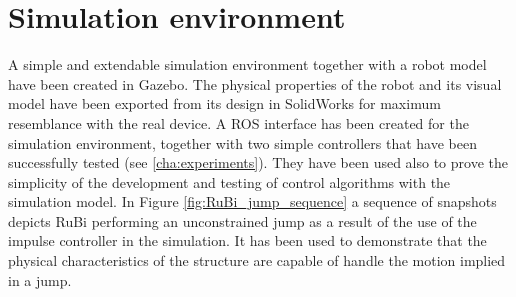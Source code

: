 \section{Simulation environment} %
\label{sec:simulation_environment}
A simple and extendable simulation environment together with a robot model have been created in Gazebo.
The physical properties of the robot and its visual model have been exported from its design in SolidWorks for maximum resemblance with the real device.
A ROS interface has been created for the simulation environment, together with two simple controllers that have been successfully tested (see \ref{cha:experiments}).
They have been used also to prove the simplicity of the development and testing of control algorithms with the simulation model.
In Figure \ref{fig:RuBi_jump_sequence} a sequence of snapshots depicts RuBi performing an unconstrained jump as a result of the use of the impulse controller in the simulation.
It has been used to demonstrate that the physical characteristics of the structure are capable of handle the motion implied in a jump. 
